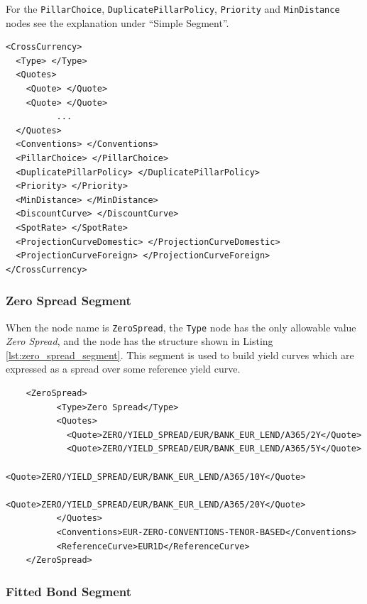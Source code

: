 For the \lstinline!PillarChoice!, \lstinline!DuplicatePillarPolicy!, \lstinline!Priority! and \lstinline!MinDistance!
nodes see the explanation under ``Simple Segment''.

\begin{listing}[H]
\begin{verbatim}
<CrossCurrency>
  <Type> </Type>
  <Quotes>
    <Quote> </Quote>
    <Quote> </Quote>
          ...
  </Quotes>
  <Conventions> </Conventions>
  <PillarChoice> </PillarChoice>
  <DuplicatePillarPolicy> </DuplicatePillarPolicy>
  <Priority> </Priority>
  <MinDistance> </MinDistance>
  <DiscountCurve> </DiscountCurve>
  <SpotRate> </SpotRate>
  <ProjectionCurveDomestic> </ProjectionCurveDomestic>
  <ProjectionCurveForeign> </ProjectionCurveForeign>
</CrossCurrency>
\end{verbatim}
\caption{Cross currency basis yield curve segment}
\label{lst:xccy_basis_segment}
\end{listing}

\subsubsection*{Zero Spread Segment}

When the node name is \lstinline!ZeroSpread!, the \lstinline!Type!
node has the only allowable value \emph{Zero Spread},  and the node has the structure shown in
Listing \ref{lst:zero_spread_segment}. This segment is used to build yield
curves which are expressed as a spread over some reference yield curve.

\begin{listing}[H]
\begin{verbatim}
    <ZeroSpread>
          <Type>Zero Spread</Type>
          <Quotes>
            <Quote>ZERO/YIELD_SPREAD/EUR/BANK_EUR_LEND/A365/2Y</Quote>
            <Quote>ZERO/YIELD_SPREAD/EUR/BANK_EUR_LEND/A365/5Y</Quote>
            <Quote>ZERO/YIELD_SPREAD/EUR/BANK_EUR_LEND/A365/10Y</Quote>
            <Quote>ZERO/YIELD_SPREAD/EUR/BANK_EUR_LEND/A365/20Y</Quote>
          </Quotes>
          <Conventions>EUR-ZERO-CONVENTIONS-TENOR-BASED</Conventions>
          <ReferenceCurve>EUR1D</ReferenceCurve>
    </ZeroSpread>
\end{verbatim}
\caption{Zero spread yield curve segment}
\label{lst:zero_spread_segment}
\end{listing}


\subsubsection*{Fitted Bond Segment}
\label{sec:fitted_bond_segment}

